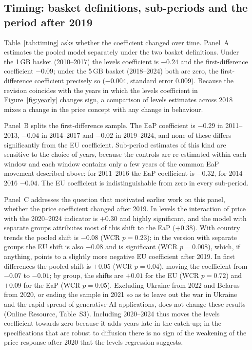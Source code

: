 \documentclass[pdflatex,sn-basic]{sn-jnl}
\begin{document}


\subsection{Timing: basket definitions, sub-periods and the period after 2019}

Table~\ref{tab:timing} asks whether the coefficient changed over time. Panel~A estimates the pooled model separately under the two basket definitions. Under the 1\,GB basket (2010--2017) the levels coefficient is $-0.24$ and the first-difference coefficient $-0.09$; under the 5\,GB basket (2018--2024) both are zero, the first-difference coefficient precisely so ($-0.004$, standard error 0.009). Because the revision coincides with the years in which the levels coefficient in Figure~\ref{fig:yearly} changes sign, a comparison of levels estimates across 2018 mixes a change in the price concept with any change in behaviour.

Panel~B splits the first-difference sample. The EaP coefficient is $-0.29$ in 2011--2013, $-0.04$ in 2014--2017 and $-0.02$ in 2019--2024, and none of these differs significantly from the EU coefficient. Sub-period estimates of this kind are sensitive to the choice of years, because the controls are re-estimated within each window and each window contains only a few years of the common EaP movement described above: for 2011--2016 the EaP coefficient is $-0.32$, for 2014--2016 $-0.04$. The EU coefficient is indistinguishable from zero in every sub-period.

Panel~C addresses the question that motivated earlier work on this panel, whether the price coefficient changed after 2019. In levels the interaction of price with the 2020--2024 indicator is $+0.30$ and highly significant, and the model with separate groups attributes most of this shift to the EaP ($+0.38$). With country trends the pooled shift is $-0.08$ (WCR $p=0.23$); in the version with separate groups the EU shift is also $-0.08$ and is significant (WCR $p=0.008$), which, if anything, points to a slightly more negative EU coefficient after 2019. In first differences the pooled shift is $+0.05$ (WCR $p=0.04$), moving the coefficient from $-0.07$ to $-0.01$; by group, the shifts are $+0.01$ for the EU (WCR $p=0.72$) and $+0.09$ for the EaP (WCR $p=0.05$). Excluding Ukraine from 2022 and Belarus from 2020, or ending the sample in 2021 so as to leave out the war in Ukraine and the rapid spread of generative-AI applications, does not change these results (Online Resource, Table~S3). Including 2020--2024 thus moves the levels coefficient towards zero because it adds years late in the catch-up; in the specifications that are robust to diffusion there is no sign of the weakening of the price response after 2020 that the levels regression suggests.
\end{document}
